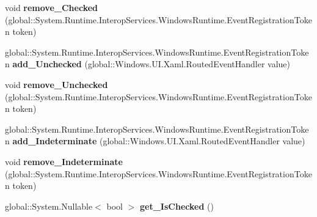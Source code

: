 \begin{DoxyCompactItemize}
void {\bfseries remove\+\_\+\+Checked} (global\+::\+System.\+Runtime.\+Interop\+Services.\+Windows\+Runtime.\+Event\+Registration\+Token token)
\item 
\mbox{\label{interface_windows_1_1_u_i_1_1_xaml_1_1_controls_1_1_primitives_1_1_i_toggle_button_af2a52e0a9086bccd03127ee7044692ab}} 
global\+::\+System.\+Runtime.\+Interop\+Services.\+Windows\+Runtime.\+Event\+Registration\+Token {\bfseries add\+\_\+\+Unchecked} (global\+::\+Windows.\+U\+I.\+Xaml.\+Routed\+Event\+Handler value)
\item 
\mbox{\label{interface_windows_1_1_u_i_1_1_xaml_1_1_controls_1_1_primitives_1_1_i_toggle_button_a4828a2c0dc3818cf5b0a8b6f35fbd268}} 
void {\bfseries remove\+\_\+\+Unchecked} (global\+::\+System.\+Runtime.\+Interop\+Services.\+Windows\+Runtime.\+Event\+Registration\+Token token)
\item 
\mbox{\label{interface_windows_1_1_u_i_1_1_xaml_1_1_controls_1_1_primitives_1_1_i_toggle_button_aa819460ff16c0555139f41a6ff334a9b}} 
global\+::\+System.\+Runtime.\+Interop\+Services.\+Windows\+Runtime.\+Event\+Registration\+Token {\bfseries add\+\_\+\+Indeterminate} (global\+::\+Windows.\+U\+I.\+Xaml.\+Routed\+Event\+Handler value)
\item 
\mbox{\label{interface_windows_1_1_u_i_1_1_xaml_1_1_controls_1_1_primitives_1_1_i_toggle_button_ab448af06ccc5e4eaca742a2ef9c88b2b}} 
void {\bfseries remove\+\_\+\+Indeterminate} (global\+::\+System.\+Runtime.\+Interop\+Services.\+Windows\+Runtime.\+Event\+Registration\+Token token)
\item 
\mbox{\label{interface_windows_1_1_u_i_1_1_xaml_1_1_controls_1_1_primitives_1_1_i_toggle_button_ab2f2c05633de2713aaa610f12657e543}} 
global\+::\+System.\+Nullable$<$ bool $>$ {\bfseries get\+\_\+\+Is\+Checked} ()
\item 
\mbox{\label{interface_windows_1_1_u_i_1_1_xaml_1_1_controls_1_1_primitives_1_1_i_toggle_button_afaace15befe9dea02eb0d81c76b8ff32}} 

\end{DoxyCompactItemize}
